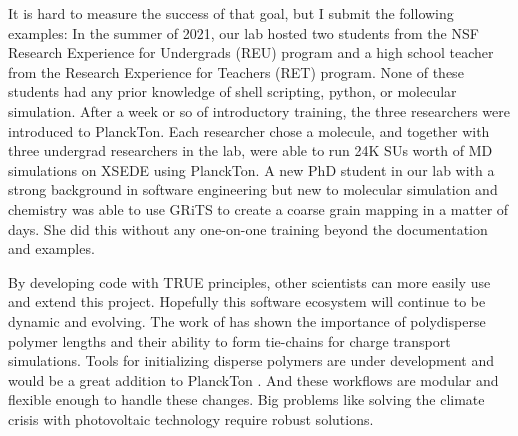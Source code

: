 It is hard to measure the success of that goal, but I submit the following examples:
In the summer of 2021, our lab hosted two students from the NSF Research Experience for Undergrads (REU) program and a high school teacher from the Research Experience for Teachers (RET) program. 
None of these students had any prior knowledge of shell scripting, python, or molecular simulation. 
After a week or so of introductory training, the three researchers were introduced to PlanckTon. 
Each researcher chose a molecule, and together with three undergrad researchers in the lab, were able to run 24K SUs worth of MD simulations on XSEDE using PlanckTon. 
A new PhD student in our lab with a strong background in software engineering but new to molecular simulation and chemistry was able to use GRiTS to create a coarse grain mapping in a matter of days. 
She did this without any one-on-one training beyond the documentation and examples.

By developing code with TRUE principles, other scientists can more easily use and extend this project.
Hopefully this software ecosystem will continue to be dynamic and evolving. 
The work of \citet{Miller2018a} has shown the importance of polydisperse polymer lengths and their ability to form tie-chains for charge transport simulations. 
Tools for initializing disperse polymers are under development and would be a great addition to PlanckTon \cite{polybinder}.
And these workflows are modular and flexible enough to handle these changes.
Big problems like solving the climate crisis with photovoltaic technology require robust solutions. 